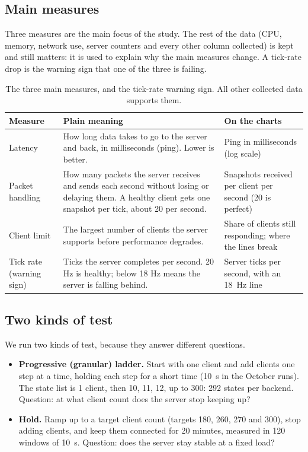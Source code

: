 \subsection{Main measures}
Three measures are the main focus of the study. The rest of the data (CPU, memory,
network use, server counters and every other column collected) is kept and still matters:
it is used to explain why the main measures change. A tick-rate drop is the warning sign
that one of the three is failing.

\begin{table}[H]
\centering
\small
\begin{tabular}{@{}p{}p{}p{}@{}}
\toprule
Measure & Plain meaning & On the charts \\
\midrule
Latency & How long data takes to go to the server and back, in milliseconds (ping). Lower is better. & Ping in milliseconds (log scale) \\
Packet handling & How many packets the server receives and sends each second without losing or delaying them. A healthy client gets one snapshot per tick, about 20 per second. & Snapshots received per client per second (20 is perfect) \\
Client limit & The largest number of clients the server supports before performance degrades. & Share of clients still responding; where the lines break \\
Tick rate (warning sign) & Ticks the server completes per second. 20 Hz is healthy; below 18 Hz means the server is falling behind. & Server ticks per second, with an 18~Hz line \\
\bottomrule
\end{tabular}
\caption{The three main measures, and the tick-rate warning sign. All other collected data supports them.}
\end{table}


\subsection{Two kinds of test}
We run two kinds of test, because they answer different questions.

\begin{itemize}
\item \textbf{Progressive (granular) ladder.} Start with one client and add
clients one step at a time, holding each step for a short time (10~s in the
October runs). The state list is 1 client, then 10, 11, 12, up to 300: 292
states per backend. Question: at what client count does the server stop
keeping up?
\item \textbf{Hold.} Ramp up to a target client count (targets 180, 260,
270 and 300), stop adding clients, and keep them connected for 20 minutes,
measured in 120 windows of 10~s. Question: does the server stay stable at a
fixed load?
\end{itemize}

